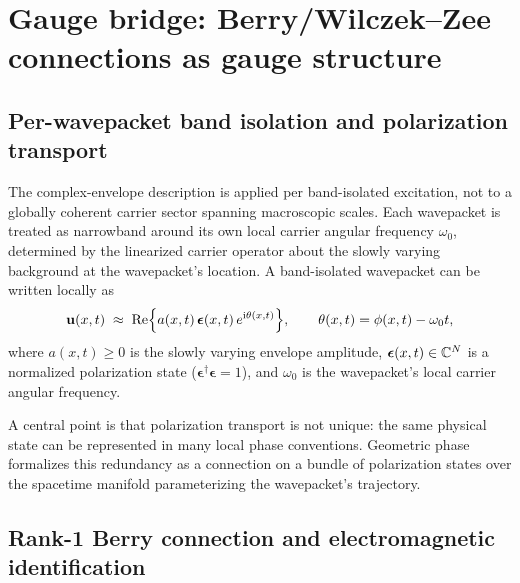\section{Gauge bridge: Berry/Wilczek--Zee connections as gauge structure}
\label{sec:gauge}

\subsection{Per-wavepacket band isolation and polarization transport}
\label{subsec:per-wavepacket-isolation}

The complex-envelope description is applied per band-isolated excitation, not to a globally
coherent carrier sector spanning macroscopic scales.
Each wavepacket is treated as narrowband around its own local carrier angular frequency $\omega_0$,
determined by the linearized carrier operator about the slowly varying background at the
wavepacket's location.
A band-isolated wavepacket can be written locally as
\begin{equation}
  \mathbf{u}(x,t)\;\approx\;\mathrm{Re}\Bigl\{
    a(x,t)\,\bm{\epsilon}(x,t)\,e^{\mathrm{i}\theta(x,t)}
  \Bigr\},
  \qquad \theta(x,t)=\phi(x,t)-\omega_0 t,
  \label{eq:quasi-monochromatic}
\end{equation}
where $a(x,t)\ge 0$ is the slowly varying envelope amplitude, $\bm{\epsilon}(x,t)\in\mathbb{C}^{N}$ is a
normalized polarization state ($\bm{\epsilon}^\dagger\bm{\epsilon}=1$), and $\omega_0$ is the
wavepacket's local carrier angular frequency.

A central point is that polarization transport is not unique: the same physical state can be
represented in many local phase conventions.
Geometric phase formalizes this redundancy as a connection on a bundle of polarization states over
the spacetime manifold parameterizing the wavepacket's trajectory.

\subsection{Rank-1 Berry connection and electromagnetic identification}

